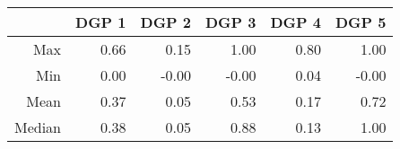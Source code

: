 \begin{table}[ht]
\centering
\begin{tabular}{rrrrrr}
  \hline
 & DGP 1 & DGP 2 & DGP 3 & DGP 4 & DGP 5 \\ 
  \hline
Max & 0.66 & 0.15 & 1.00 & 0.80 & 1.00 \\ 
  Min & 0.00 & -0.00 & -0.00 & 0.04 & -0.00 \\ 
  Mean & 0.37 & 0.05 & 0.53 & 0.17 & 0.72 \\ 
  Median & 0.38 & 0.05 & 0.88 & 0.13 & 1.00 \\ 
   \hline
\end{tabular}
\end{table}
